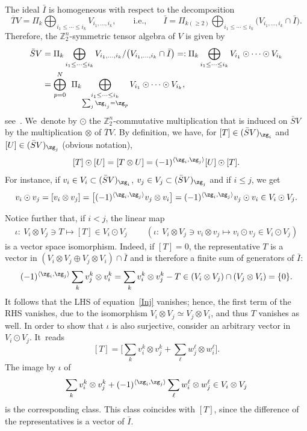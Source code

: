 \documentclass[10pt,a4paper]{amsart}
\newcommand{\Z}{{\mathbb Z}}
\def\la{\langle}
\newcommand{\0}{\otimes}
\numberwithin{equation}{section}
\begin{document}
The ideal $\bar I$ is homogeneous with respect to the decomposition
\[
\overline{T}V=\Pi_k\bigoplus_{i_1\le\cdots\le i_k}V_{i_1,\dots, i_k},\qquad\text{i.e.,}\qquad \bar I=\Pi_{k(\ge 2)}\bigoplus_{i_1\le\cdots\le i_k}\big(V_{i_1,\dots, i_k}\cap \bar I\big).
\]
Therefore, the $\Z_2^n$-symmetric tensor algebra of $V$ is given by
\begin{align}
\bar{S}V&=\Pi_k \bigoplus_{i_1\le\cdots\le i_k} V_{i_1,\dots,i_k}/\big(V_{i_1,\dots,i_k}\cap \bar I\big)=:\Pi_k \bigoplus_{i_1\le\cdots\le i_k} V_{i_1}\odot\cdots\odot V_{i_k}\nonumber
\\ \label{GraSymTenAlg}
&=\bigoplus_{p=0}^N\;\,\Pi_k\! \bigoplus_{\begin{subarray}{c}{i_1\le\cdots\le i_k}\\ {\sum_j\zg_{i_j}=\zg_p}\end{subarray}} V_{i_1}\odot\cdots\odot V_{i_k},
\end{align}
see~\cite{BP13}. We~denote by $\odot$ the $\Z_2^n$-commutative multiplication that is induced on $\bar{S}V$ by the multiplication $\0$ of $\overline{T}V$. By definition, we have, for $[T]\in (\bar S V)_{\zg_i}$ and $[U]\in (\bar S V)_{\zg_j}$ (obvious notation),
\[
[T]\odot[U]=[T\0 U]=(-1)^{\la \zg_i,\zg_j\rangle}[U]\odot[T].
\]
For instance, if $v_i\in V_i\subset(\bar{S}V)_{\zg_i}$, $v_j\in V_j\subset(\bar{S}V)_{\zg_j}$ and if $i\le j$, we get
\begin{gather}\label{GraCom}
v_i\odot v_j=[v_i\0 v_j] =\big[(-1)^{\la\zg_i,\zg_j\rangle}v_j\0v_i\big] =(-1)^{\la\zg_i,\zg_j\rangle}v_j\odot v_i\in V_i\odot V_j.
\end{gather}

Notice further that, if $i<j$, the linear map
\begin{gather}\label{CanIsoTen}
\iota\colon\ V_i\0 V_j\ni T\mapsto [T]\in V_i\odot V_j\qquad\ (\iota\colon\ V_i\0 V_j\ni v_i\0 v_j\mapsto v_i\odot v_j\in V_i\odot V_j)
\end{gather}
is a vector space isomorphism. Indeed, if $[T]=0$, the representative $T$ is a vector in $(V_i\0 V_j\oplus V_j\0 V_i)\cap\bar I$ and is therefore a finite sum of generators of $\bar I$:
\begin{gather}\label{Inj}
(-1)^{\la \zg_i,\zg_j\rangle}\sum_kv^k_j\0 v^k_i=\sum_kv^k_i\0 v^k_j-T\in (V_i\0 V_j)\cap(V_j\0 V_i)=\{0\}.
\end{gather}
It follows that the {\small LHS} of
equation~\eqref{Inj} vanishes; hence, the first term of the {\small RHS} vanishes, due to the isomorphism $V_i\0 V_j\simeq V_j\0 V_i$, and thus $T$ vanishes as well. In order to show that $\iota$ is also surjective, consider an arbitrary vector in $V_i\odot V_j$. It~reads
\[
[T]=\bigg[\sum_k v_i^k\0 v_j^k+\sum_\ell w_j^\ell\0 w_i^\ell\bigg].
\]
The image by $\iota$ of
\[
\sum_k v_i^k\0 v_j^k+(-1)^{\la\zg_i,\zg_j\rangle}\sum_\ell w_i^\ell\0 w_j^\ell\in V_i\0 V_j
\]
is the corresponding class. This class coincides with $[T]$, since the difference of the representatives is a vector of $\bar I$.
\end{document}

